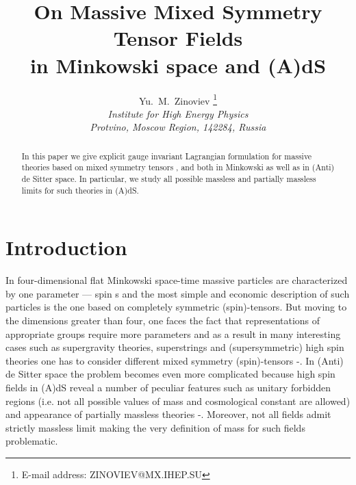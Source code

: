 \documentclass[a4paper,12pt]{article}
\author{Yu.~M.~Zinoviev
       \thanks{E-mail address: ZINOVIEV@MX.IHEP.SU} \\
        {\it Institute for High Energy Physics} \\
        {\it Protvino, Moscow Region, 142284, Russia}}
\title{On Massive Mixed Symmetry Tensor Fields \\
in Minkowski space and (A)dS}
\date{}
\begin{document}
\maketitle

\begin{abstract}
In this paper we give explicit gauge invariant Lagrangian formulation
for massive theories based on mixed symmetry tensors
\myHighlight{$\Phi_{[\mu\nu],\alpha}$}\coordHE{}, \coordHE{} and
\coordHE{} both in Minkowski as well as in (Anti) de
Sitter space. In particular, we study all possible massless and partially
massless limits for such theories in (A)dS.
\end{abstract}

\newpage
\setcounter{page}{1}

\section*{Introduction}

In four-dimensional flat Minkowski space-time massive particles are
characterized by one parameter --- spin s and the most simple and
economic description of such particles is the one based on completely
symmetric (spin)-tensors. But moving to the dimensions greater than four,
one faces the fact that representations of appropriate groups
require more parameters and as a result in many interesting cases such
as supergravity theories, superstrings and (supersymmetric) high spin
theories one has to consider different mixed symmetry (spin)-tensors
\cite{Cur86}-\cite{MH02}. In (Anti) de Sitter space the problem becomes even
more complicated because high spin fields in (A)dS reveal a number of
peculiar features such as unitary forbidden regions (i.e. not all
possible values of mass and cosmological constant are allowed) and
appearance of partially massless theories \cite{DN83}-\cite{DW01c}. Moreover,
not all fields admit strictly massless limit \cite{BMV00} making the
very definition of mass for such fields problematic.
\end{document}
